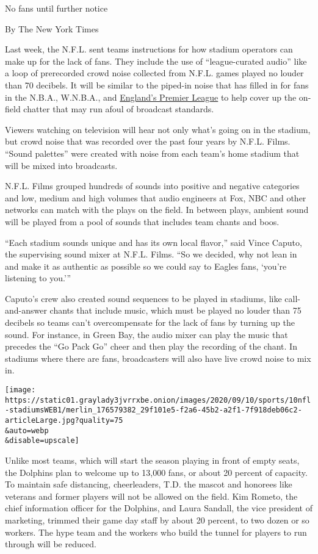 No fans until further notice

By The New York Times

Last week, the N.F.L. sent teams instructions for how stadium operators
can make up for the lack of fans. They include the use of
``league-curated audio'' like a loop of prerecorded crowd noise
collected from N.F.L. games played no louder than 70 decibels. It will
be similar to the piped-in noise that has filled in for fans in the
N.B.A., W.N.B.A., and
\href{https://www.nytimes3xbfgragh.onion/2020/06/16/sports/coronavirus-stadium-fans-crowd-noise.html}{England's
Premier League} to help cover up the on-field chatter that may run afoul
of broadcast standards.

Viewers watching on television will hear not only what's going on in the
stadium, but crowd noise that was recorded over the past four years by
N.F.L. Films. ``Sound palettes'' were created with noise from each
team's home stadium that will be mixed into broadcasts.

N.F.L. Films grouped hundreds of sounds into positive and negative
categories and low, medium and high volumes that audio engineers at Fox,
NBC and other networks can match with the plays on the field. In between
plays, ambient sound will be played from a pool of sounds that includes
team chants and boos.

``Each stadium sounds unique and has its own local flavor,'' said Vince
Caputo, the supervising sound mixer at N.F.L. Films. ``So we decided,
why not lean in and make it as authentic as possible so we could say to
Eagles fans, `you're listening to you.'''

Caputo's crew also created sound sequences to be played in stadiums,
like call-and-answer chants that include music, which must be played no
louder than 75 decibels so teams can't overcompensate for the lack of
fans by turning up the sound. For instance, in Green Bay, the audio
mixer can play the music that precedes the ``Go Pack Go'' cheer and then
play the recording of the chant. In stadiums where there are fans,
broadcasters will also have live crowd noise to mix in.

\texttt{[image: https://static01.graylady3jvrrxbe.onion/images/2020/09/10/sports/10nfl-stadiumsWEB1/merlin\_176579382\_29f101e5-f2a6-45b2-a2f1-7f918deb06c2-articleLarge.jpg?quality=75\\\&auto=webp\\\&disable=upscale]}

Unlike most teams, which will start the season playing in front of empty
seats, the Dolphins plan to welcome up to 13,000 fans, or about 20
percent of capacity. To maintain safe distancing, cheerleaders, T.D. the
mascot and honorees like veterans and former players will not be allowed
on the field. Kim Rometo, the chief information officer for the
Dolphins, and Laura Sandall, the vice president of marketing, trimmed
their game day staff by about 20 percent, to two dozen or so workers.
The hype team and the workers who build the tunnel for players to run
through will be reduced.

